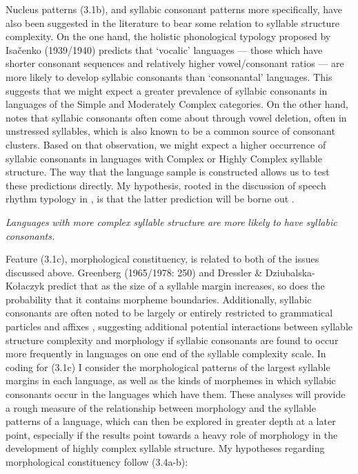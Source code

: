   Nucleus patterns (3.1b), and syllabic consonant patterns more specifically, have also been suggested in the literature to bear some relation to syllable structure complexity. On the one hand, the holistic phonological typology proposed by Isačenko (1939/1940) predicts that ‘vocalic’ languages — those which have shorter consonant sequences and relatively higher vowel/consonant ratios — are more likely to develop syllabic consonants than ‘consonantal’ languages. This suggests that we might expect a greater prevalence of syllabic consonants in languages of the Simple and Moderately Complex categories. On the other hand, \citet{Bell1978a} notes that syllabic consonants often come about through vowel deletion, often in unstressed syllables, which is also known to be a common source of consonant clusters. Based on that observation, we might expect a higher occurrence of syllabic consonants in languages with Complex or Highly Complex syllable structure. The way that the language sample is constructed allows us to test these predictions directly. My hypothesis, rooted in the discussion of speech rhythm typology in , is that the latter prediction will be borne out .

\ea\label{ex:(3.3)}
   \textit{Languages} \textit{with} \textit{more} \textit{complex} \textit{syllable} \textit{structure} \textit{are} \textit{more} \textit{likely} \textit{to} \textit{have} \textit{syllabic} \textit{consonants.}
\z

  Feature (3.1c), morphological constituency, is related to both of the issues discussed above. Greenberg (1965/1978: 250) and Dressler \& Dziubalska-Kołaczyk  predict that as the size of a syllable margin increases, so does the probability that it contains morpheme boundaries. Additionally, syllabic consonants are often noted to be largely or entirely restricted to grammatical particles and affixes \citep[159]{Bell1978a}, suggesting additional potential interactions between syllable structure complexity and morphology if syllabic consonants are found to occur more frequently in languages on one end of the syllable complexity scale. In coding for (3.1c) I consider the morphological patterns of the largest syllable margins in each language, as well as the kinds of morphemes in which syllabic consonants occur in the languages which have them. These analyses will provide a rough measure of the relationship between morphology and the syllable patterns of a language, which can then be explored in greater depth at a later point, especially if the results point towards a heavy role of morphology in the development of highly complex syllable structure. My hypotheses regarding morphological constituency follow (3.4a-b):


